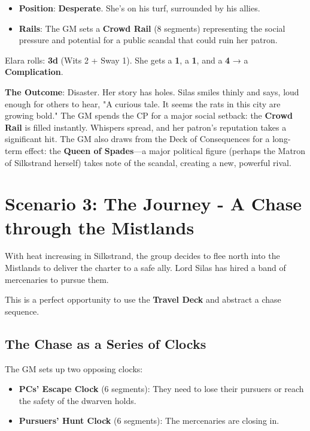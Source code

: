 \begin{itemize}
    \item \textbf{Position}: \textbf{Desperate}. She's on his turf, surrounded by his allies.
    \item \textbf{Rails}: The GM sets a \textbf{Crowd Rail} (8 segments) representing the social pressure and potential for a public scandal that could ruin her patron.
\end{itemize}

Elara rolls: \textbf{3d} (Wits 2 + Sway 1). She gets a \textbf{1}, a \textbf{1}, and a \textbf{4} → a \textbf{Complication}.

\textbf{The Outcome}: Disaster. Her story has holes. Silas smiles thinly and says, loud enough for others to hear, "A curious tale. It seems the rats in this city are growing bold." The GM spends the CP for a major social setback: the \textbf{Crowd Rail} is filled instantly. Whispers spread, and her patron's reputation takes a significant hit. The GM also draws from the Deck of Consequences for a long-term effect: the \textbf{Queen of Spades}—a major political figure (perhaps the Matron of Silkstrand herself) takes note of the scandal, creating a new, powerful rival.

\section*{Scenario 3: The Journey - A Chase through the Mistlands}

With heat increasing in Silkstrand, the group decides to flee north into the Mistlands to deliver the charter to a safe ally. Lord Silas has hired a band of mercenaries to pursue them.

This is a perfect opportunity to use the \textbf{Travel Deck} and abstract a chase sequence.

\subsection*{The Chase as a Series of Clocks}

The GM sets up two opposing clocks:
\begin{itemize}
    \item \textbf{PCs' Escape Clock} (6 segments): They need to lose their pursuers or reach the safety of the dwarven holds.
    \item \textbf{Pursuers' Hunt Clock} (6 segments): The mercenaries are closing in.
\end{itemize}

